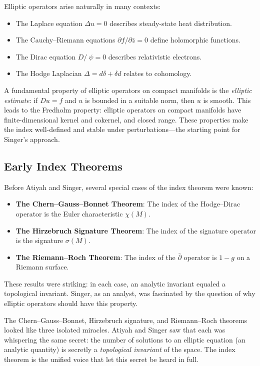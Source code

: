 Elliptic operators arise naturally in many contexts:
\begin{itemize}
\item The Laplace equation $\Delta u = 0$ describes steady-state heat distribution.
\item The Cauchy--Riemann equations $\partial f / \partial \bar z = 0$ define holomorphic functions.
\item The Dirac equation $D\!\!\!\!/ \ \psi = 0$ describes relativistic electrons.
\item The Hodge Laplacian $\Delta = d\delta + \delta d$ relates to cohomology.
\end{itemize}

A fundamental property of elliptic operators on compact manifolds is the \emph{elliptic estimate}: if $Du = f$ and $u$ is bounded in a suitable norm, then $u$ is smooth. This leads to the Fredholm property: elliptic operators on compact manifolds have finite-dimensional kernel and cokernel, and closed range. These properties make the index well-defined and stable under perturbations---the starting point for Singer's approach.

\subsection{Early Index Theorems}

Before Atiyah and Singer, several special cases of the index theorem were known:
\begin{itemize}
\item \textbf{The Chern--Gauss--Bonnet Theorem}: The index of the Hodge--Dirac operator is the Euler characteristic $\chi(M)$.
\item \textbf{The Hirzebruch Signature Theorem}: The index of the signature operator is the signature $\sigma(M)$.
\item \textbf{The Riemann--Roch Theorem}: The index of the $\bar\partial$ operator is $1-g$ on a Riemann surface.
\end{itemize}

These results were striking: in each case, an analytic invariant equaled a topological invariant. Singer, as an analyst, was fascinated by the question of why elliptic operators should have this property.

\begin{bigidea}
The Chern--Gauss--Bonnet, Hirzebruch signature, and Riemann--Roch theorems looked like three isolated miracles. Atiyah and Singer saw that each was whispering the same secret: the number of solutions to an elliptic equation (an analytic quantity) is secretly a \emph{topological invariant} of the space. The index theorem is the unified voice that let this secret be heard in full.
\end{bigidea}

